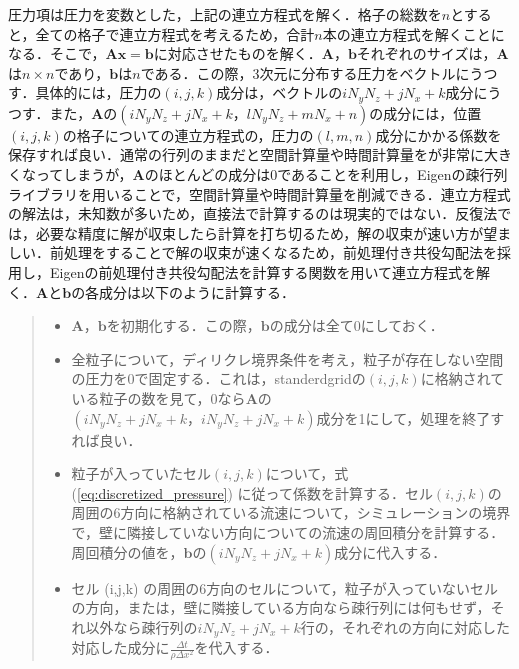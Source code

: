 \documentclass[a4j,12pt]{jreport}
\begin{document}
圧力項は圧力を変数とした，上記の連立方程式を解く．格子の総数を$n$とすると，全ての格子で連立方程式を考えるため，合計$n$本の連立方程式を解くことになる．そこで，$\bm{Ax=b}$に対応させたものを解く．$\bm{A}$，$\bm{b}$それぞれのサイズは，$\bm{A}$は$n \times n$であり，$\bm{b}$は$n$である．この際，3次元に分布する圧力をベクトルにうつす．具体的には，圧力の$ (i,j,k) $成分は，ベクトルの$iN_yN_z+jN_x+k$成分にうつす．また，$\bm{A}$の$ (iN_yN_z+jN_x+k，lN_yN_z+mN_x+n) $の成分には，位置$ (i,j,k) $の格子についての連立方程式の，圧力の$ (l,m,n) $成分にかかる係数を保存すれば良い．通常の行列のままだと空間計算量や時間計算量をが非常に大きくなってしまうが，$\bm{A}$のほとんどの成分は$0$であることを利用し，Eigenの疎行列ライブラリを用いることで，空間計算量や時間計算量を削減できる．連立方程式の解法は，未知数が多いため，直接法で計算するのは現実的ではない．反復法では，必要な精度に解が収束したら計算を打ち切るため，解の収束が速い方が望ましい．前処理をすることで解の収束が速くなるため，前処理付き共役勾配法を採用し，Eigenの前処理付き共役勾配法を計算する関数を用いて連立方程式を解く．$\bm{A}$と$\bm{b}$の各成分は以下のように計算する．
\begin{quote}
	\begin{itemize}
		\item $\bm{A}$，$\bm{b}$を初期化する．この際，$\bm{b}$の成分は全て0にしておく．
		\item 全粒子について，ディリクレ境界条件を考え，粒子が存在しない空間の圧力を$0$で固定する．これは，standerdgridの$ (i,j,k) $に格納されている粒子の数を見て，0なら$\bm{A}$の$ (iN_yN_z+jN_x+k，iN_yN_z+jN_x+k) $成分を1にして，処理を終了すれば良い．
		\item 粒子が入っていたセル$ (i,j,k) $について，式 (\ref{eq:discretized_pressure}) に従って係数を計算する．セル$ (i,j,k) $の周囲の6方向に格納されている流速について，シミュレーションの境界で，壁に隣接していない方向についての流速の周回積分を計算する．周回積分の値を，$\bm{b}$の$ (iN_yN_z+jN_x+k) $成分に代入する．
		\item セル (i,j,k) の周囲の6方向のセルについて，粒子が入っていないセルの方向，または，壁に隣接している方向なら疎行列には何もせず，それ以外なら疎行列の$iN_yN_z+jN_x+k$行の，それぞれの方向に対応した対応した成分に$\frac{\varDelta t}{\rho\varDelta x^2}$を代入する．
	\end{itemize}
\end{quote}
\end{document}
